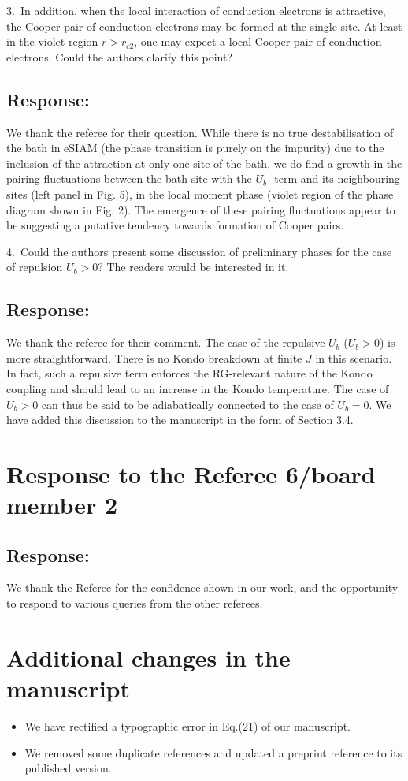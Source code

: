 \documentclass{article}
\newcommand{\response}[1]{{\color{blue}\subsection*{Response:}{#1}\vspace*{10pt}}}
\begin{document}
3.~In addition, when the local interaction of conduction electrons is attractive, the Cooper pair of conduction electrons may be formed at the single site. At least in the violet region $r>r_{c2}$, one may expect a local Cooper pair of conduction electrons. Could the authors clarify this point?

\response{
We thank the referee for their question. While there is no true destabilisation of the bath in eSIAM (the phase transition is purely on the impurity) due to the inclusion of the attraction at only one site of the bath, %
we do find a growth in the pairing fluctuations between the bath site with the \(U_b\)- term and its neighbouring sites (left panel in Fig. 5), in the local moment phase (violet region of the phase diagram shown in Fig. 2). The emergence of these pairing fluctuations appear to be suggesting a putative tendency towards formation of Cooper pairs.
}

4.~Could the authors present some discussion of preliminary phases for the case of repulsion $U_b>0$?  The readers would be interested in it.

\response{
We thank the referee for their comment. The case of the repulsive \(U_b\) (\(U_b > 0\)) is more straightforward. There is no Kondo breakdown at finite \(J\) in this scenario. In fact, such a repulsive term enforces the RG-relevant nature of the Kondo coupling and should lead to an increase in the Kondo temperature. The case of \(U_b > 0\) can thus be said to be adiabatically connected to the case of \(U_b = 0\). We have added this discussion to the manuscript in the form of Section 3.4.
}


\section*{Response to the Referee 6/board member 2}
\response{We thank the Referee for the confidence shown in our work, and the opportunity to respond to various queries from the other referees.}

\section*{Additional changes in the manuscript}
\begin{itemize}
	\item We have rectified a typographic error in Eq.(21) of our manuscript.
	\item We removed some duplicate references and updated a preprint reference to its published version.
\end{itemize}





\end{document}
